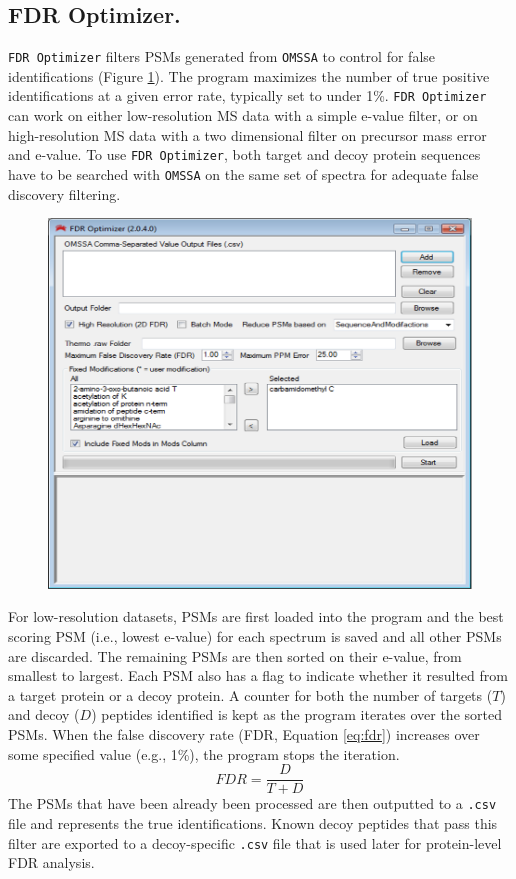 \subsection*{FDR Optimizer.}
\texttt{FDR Optimizer} filters PSMs generated from \texttt{OMSSA} to control for false identifications (Figure \ref{fig:fdr}). The program maximizes the number of true positive identifications at a given error rate, typically set to under 1\%. \texttt{FDR Optimizer} can work on either low-resolution MS data with a simple e-value filter, or on high-resolution MS data with a two dimensional filter on precursor mass error and e-value. To use \texttt{FDR Optimizer}, both target and decoy protein sequences have to be searched with \texttt{OMSSA} on the same set of spectra for adequate false discovery filtering. 
\begin{figure}[p]
	\centering
	\includegraphics[width=\columnwidth]{csmsl/fdr.png}
	\label{fig:fdr}
\end{figure}

For low-resolution datasets, PSMs are first loaded into the program and the best scoring PSM (i.e., lowest e-value) for each spectrum is saved and all other PSMs are discarded. The remaining PSMs are then sorted on their e-value, from smallest to largest. Each PSM also has a flag to indicate whether it resulted from a target protein or a decoy protein. A counter for both the number of targets ($T$) and decoy ($D$) peptides identified is kept as the program iterates over the sorted PSMs. When the false discovery rate (FDR, Equation \ref{eq:fdr}) increases over some specified value (e.g., 1\%), the program stops the iteration.
\begin{equation}
FDR =\frac{D}{T + D}
\label{eq:fdr}
\end{equation}
The PSMs that have been already been processed are then outputted to a \texttt{.csv} file and represents the true identifications. Known decoy peptides that pass this filter are exported to a decoy-specific \texttt{.csv} file that is used later for protein-level FDR analysis.

